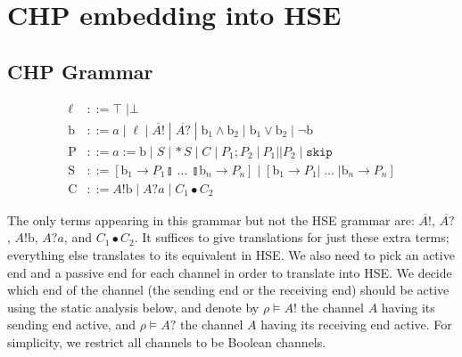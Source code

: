 \documentclass[times, 10pt]{article}
\begin{document}
\section{CHP embedding into HSE}

\begin{comment}
\subsection{HSE Grammar}
\begin{align*}
    \ell & ::= \top \; | \bot \\
    \mathrm{b} & ::= a \; | \; \ell \; | \; \mathrm{b}_1 \wedge \mathrm{b}_2 \; | \; \mathrm{b}_1 \vee \mathrm{b}_2 \; | \; \lnot \mathrm{b} \\
    \mathrm{P} & ::= a := \mathrm{b} \; | \; S \; | \, *S \; | \; P_1; P_2 \; | \: P_1 || P_2 \; | \; \mathtt{skip} \\
    \mathrm{S} & ::= [ \mathrm{b}_1 \rightarrow P_1 \talloblong \; \ldots \; \talloblong \mathrm{b}_n \rightarrow P_n ] \; | \; [ \mathrm{b}_1 \rightarrow P_1 | \; \ldots \; | \mathrm{b}_n \rightarrow P_n ] \\
\end{align*}

\end{comment}


\subsection{CHP Grammar}
\begin{align*}
    \ell & ::= \top \; | \bot \\
    \mathrm{b} & ::= a \; | \; \ell \; | \; \overline{A!} \; | \; \overline{A?} \; | \; \mathrm{b}_1 \wedge \mathrm{b}_2 \; | \; \mathrm{b}_1 \vee \mathrm{b}_2 \; | \; \lnot \mathrm{b} \\
    \mathrm{P} & ::= a := \mathrm{b} \; | \; S \; | \, *S \; | \; C \; | \; P_1; P_2 \; | \: P_1 || P_2 \; | \; \mathtt{skip} \\
    \mathrm{S} & ::= [ \mathrm{b}_1 \rightarrow P_1 \talloblong \; \ldots \; \talloblong \mathrm{b}_n \rightarrow P_n ] \; | \; [ \mathrm{b}_1 \rightarrow P_1 | \; \ldots \; | \mathrm{b}_n \rightarrow P_n ] \\
    \mathrm{C} & ::= A!\mathrm{b} \; | \; A?a \; | \; C_1 \bullet C_2
\end{align*}

The only terms appearing in this grammar but not the HSE grammar are:
$\overline{A!}$, $\overline{A?}$, $A!\mathrm{b}$, $A?a$, and $C_1 \bullet C_2$.
It suffices to give translations for just these extra terms;
everything else translates to its equivalent in HSE. We also need to pick an
active end and a passive end for each channel in order to translate into HSE.
We decide which end of the channel (the sending end or the receiving end) should
be active using the static analysis below, and denote by $\rho \vDash A!$ the
channel $A$ having its sending end active, and $\rho \vDash A?$ the channel $A$
having its receiving end active.  For simplicity, we restrict all channels to be
Boolean channels.
\end{document}
